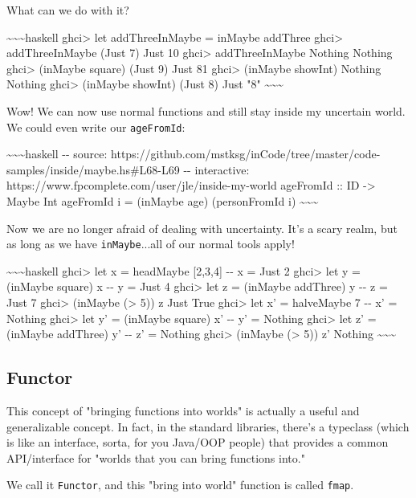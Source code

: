 \documentclass[]{article}
\begin{document}
What can we do with it?

\textasciitilde{}\textasciitilde{}\textasciitilde{}haskell ghci\textgreater{}
let addThreeInMaybe = inMaybe addThree ghci\textgreater{} addThreeInMaybe (Just
7) Just 10 ghci\textgreater{} addThreeInMaybe Nothing Nothing ghci\textgreater{}
(inMaybe square) (Just 9) Just 81 ghci\textgreater{} (inMaybe showInt) Nothing
Nothing ghci\textgreater{} (inMaybe showInt) (Just 8) Just "8"
\textasciitilde{}\textasciitilde{}\textasciitilde{}

Wow! We can now use normal functions and still stay inside my uncertain world.
We could even write our \texttt{ageFromId}:

\textasciitilde{}\textasciitilde{}\textasciitilde{}haskell -\/- source:
https://github.com/mstksg/inCode/tree/master/code-samples/inside/maybe.hs\#L68-L69
-\/- interactive: https://www.fpcomplete.com/user/jle/inside-my-world ageFromId
:: ID -\textgreater{} Maybe Int ageFromId i = (inMaybe age) (personFromId i)
\textasciitilde{}\textasciitilde{}\textasciitilde{}

Now we are no longer afraid of dealing with uncertainty. It's a scary realm, but
as long as we have \texttt{inMaybe}...all of our normal tools apply!

\textasciitilde{}\textasciitilde{}\textasciitilde{}haskell ghci\textgreater{}
let x = headMaybe {[}2,3,4{]} -\/- x = Just 2 ghci\textgreater{} let y =
(inMaybe square) x -\/- y = Just 4 ghci\textgreater{} let z = (inMaybe addThree)
y -\/- z = Just 7 ghci\textgreater{} (inMaybe (\textgreater{} 5)) z Just True
ghci\textgreater{} let x' = halveMaybe 7 -\/- x' = Nothing ghci\textgreater{}
let y' = (inMaybe square) x' -\/- y' = Nothing ghci\textgreater{} let z' =
(inMaybe addThree) y' -\/- z' = Nothing ghci\textgreater{} (inMaybe
(\textgreater{} 5)) z' Nothing
\textasciitilde{}\textasciitilde{}\textasciitilde{}

\subsection{Functor}

This concept of "bringing functions into worlds" is actually a useful and
generalizable concept. In fact, in the standard libraries, there's a typeclass
(which is like an interface, sorta, for you Java/OOP people) that provides a
common API/interface for "worlds that you can bring functions into."

We call it \texttt{Functor}, and this "bring into world" function is called
\texttt{fmap}.
\end{document}
